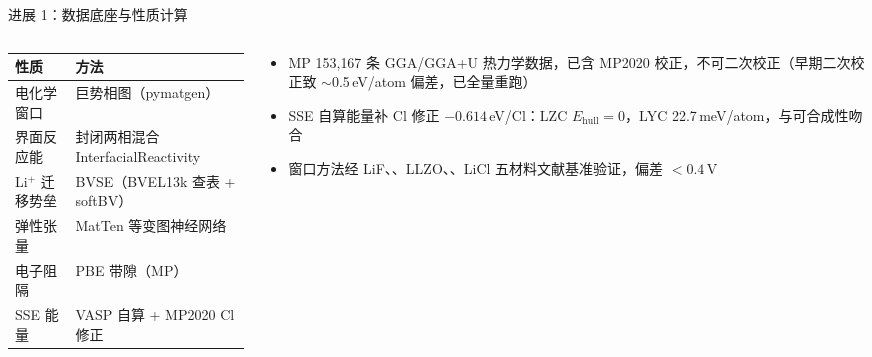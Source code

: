 \documentclass[aspectratio=169,10pt]{beamer}
\begin{document}
\begin{frame}[t]{进展 1：数据底座与性质计算}
\begin{columns}[T,onlytextwidth]
  \begin{column}{.52\textwidth}
    {\footnotesize
    \begin{tabular}{@{}ll@{}}
      \toprule
      性质 & 方法 \\
      \midrule
      电化学窗口 & 巨势相图（pymatgen） \\
      界面反应能 & 封闭两相混合 InterfacialReactivity \\
      Li$^+$ 迁移势垒 & BVSE（BVEL13k 查表 + softBV） \\
      弹性张量 & MatTen 等变图神经网络 \\
      电子阻隔 & PBE 带隙（MP） \\
      SSE 能量 & VASP 自算 + MP2020 Cl 修正 \\
      \bottomrule
    \end{tabular}}
  \end{column}
  \begin{column}{.44\textwidth}
    \begin{itemize}
      \item MP 153{,}167 条 GGA/GGA+U 热力学数据，已含 MP2020 校正，\alert{不可二次校正}（早期二次校正致 $\sim$0.5\,eV/atom 偏差，已全量重跑）
      \item SSE 自算能量补 Cl 修正 $-0.614$\,eV/Cl：LZC $E_\mathrm{hull}=0$，LYC 22.7\,meV/atom，与可合成性吻合
      \item 窗口方法经 LiF、、LLZO、、LiCl 五材料文献基准验证，偏差 $<0.4$\,V
    \end{itemize}
  \end{column}
\end{columns}
\end{frame}
\end{document}

